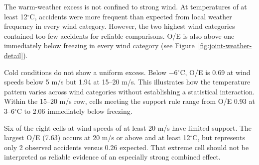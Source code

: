 The warm-weather excess is not confined to strong wind. At temperatures of at least 12$^{\circ}$C, accidents were more frequent
than expected from local weather frequency in every wind category.
However, the two highest wind categories contained too few accidents
for reliable comparisons. O/E is also above one immediately below freezing in every wind category (see Figure~\ref{fig:joint-weather-detail}).

Cold conditions do not show a uniform excess. Below $-6$$^{\circ}$C, O/E is 0.69 at wind speeds below 5 m/s but 1.94 at 15--20 m/s. This illustrates how the temperature pattern varies across wind categories without establishing a statistical interaction. Within the 15--20 m/s row, cells meeting the support rule range from O/E 0.93 at 3--6$^{\circ}$C to 2.06 immediately below freezing.

Six of the eight cells at wind speeds of at least 20 m/s have limited support. The largest O/E (7.63) occurs at 20 m/s or above and at least 12$^{\circ}$C, but represents only 2 observed accidents versus 0.26 expected. That extreme cell should not be interpreted as reliable evidence of an especially strong combined effect.
